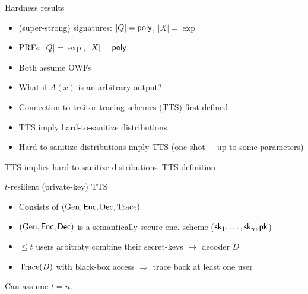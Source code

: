 \begin{frame}{Hardness results~\cite{conf/stoc/DworkNRRV09}}
  \begin{itemize}
    \item (super-strong) signatures: $|Q| = \mathsf{poly}$, $|X| = \exp$
    \item PRFs: $|Q| = \exp$, $|X| = \mathsf{poly}$
    \item Both assume OWFs
    \end{itemize}

    \begin{itemize}
        \item What if $A(x)$ is an arbitrary output?
        \item Connection to traitor tracing schemes (TTS) first
          defined~\cite{Chor94tracingtraitors}
    \end{itemize}

    \begin{itemize}
        \item TTS imply hard-to-sanitize distributions
        \item Hard-to-sanitize distributions imply TTS (one-shot + up to some parameters)
     \end{itemize}
\end{frame}

\begin{frame}{TTS implies hard-to-sanitize
    distributions~\cite{conf/stoc/DworkNRRV09}}{TTS definition}

  $t$-resilient (private-key) TTS
  \begin{itemize}
  \item Consists of $(\mathrm{Gen}, \mathsf{Enc}, \mathsf{Dec}, \mathrm{Trace})$ 
  \item $(\mathrm{Gen}, \mathsf{Enc}, \mathsf{Dec})$ is a semantically secure enc. scheme ($\mathsf{sk}_1,\ldots,\mathsf{sk}_n,\mathsf{pk}$)
  \item $\leq t$ users arbitraty combine their secret-keys $\longrightarrow$ decoder $D$
  \item $\mathrm{Trace}(D)$ with black-box access $\Longrightarrow$ trace back at least one user  
  \end{itemize}
  Can assume $t=n$.
\end{frame}

